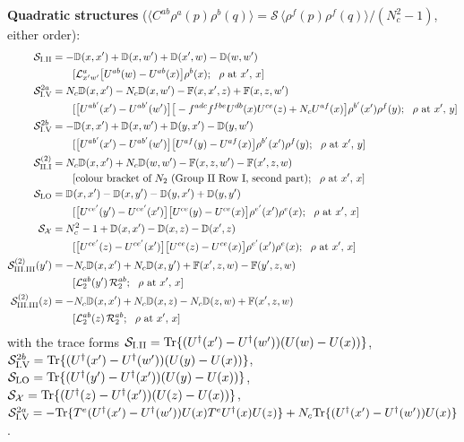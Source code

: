 \documentclass[9pt]{article}
\def\mf#1{\mathbb{#1}}
\numberwithin{equation}{section}
\begin{document}
{\noindent\textbf{Quadratic structures} ($\langle C^{ab}\rho^{a}(p)\rho^{b}(q)\rangle=\mathcal{S}\,\langle\rho^{f}(p)\rho^{f}(q)\rangle/(N_{c}^{2}-1)$, either order):
\begin{align}
\mathcal{S}_{\rm I.II}&=-\mf{D}(x,x')+\mf{D}(x,w')+\mf{D}(x',w)-\mf{D}(w,w')\notag\\&\qquad[\mathcal{L}^{a}_{x'w'}\big[U^{ab}(w)-U^{ab}(x)\big]\rho^{b}(x);\ \ \rho\text{ at }x',\,x]\notag\\
\mathcal{S}_{\rm I.V}^{2a}&=N_{c}\mf{D}(x,x')-N_{c}\mf{D}(x,w')-\mf{F}(x,x',z)+\mf{F}(x,z,w')\notag\\&\qquad[\big[U^{ab'}(x')-U^{ab'}(w')\big]\big[-f^{adc}f^{fbe}U^{db}(x)U^{ce}(z)+N_{c}U^{af}(x)\big]\rho^{b'}(x')\rho^{f}(y);\ \ \rho\text{ at }x',\,y]\notag\\
\mathcal{S}_{\rm I.V}^{2b}&=-\mf{D}(x,x')+\mf{D}(x,w')+\mf{D}(y,x')-\mf{D}(y,w')\notag\\&\qquad[\big[U^{ab'}(x')-U^{ab'}(w')\big]\big[U^{af}(y)-U^{af}(x)\big]\rho^{b'}(x')\rho^{f}(y);\ \ \rho\text{ at }x',\,y]\notag\\
\mathcal{S}_{\rm II.I}^{(2)}&=N_{c}\mf{D}(x,x')+N_{c}\mf{D}(w,w')-\mf{F}(x,z,w')-\mf{F}(x',z,w)\notag\\&\qquad[\text{colour bracket of } N_{2}\text{ (Group II Row I, second part)};\ \ \rho\text{ at }x',\,x]\notag\\
\mathcal{S}_{\rm LO}&=\mf{D}(x,x')-\mf{D}(x,y')-\mf{D}(y,x')+\mf{D}(y,y')\notag\\&\qquad[\big[U^{ce'}(y')-U^{ce'}(x')\big]\big[U^{ce}(y)-U^{ce}(x)\big]\rho^{e'}(x')\rho^{e}(x);\ \ \rho\text{ at }x',\,x]\notag\\
\mathcal{S}_{\mathcal{X}}&=N_{c}^{2}-1+\mf{D}(x,x')-\mf{D}(x,z)-\mf{D}(x',z)\notag\\&\qquad[\big[U^{ce'}(z)-U^{ce'}(x')\big]\big[U^{ce}(z)-U^{ce}(x)\big]\rho^{e'}(x')\rho^{e}(x);\ \ \rho\text{ at }x',\,x]\notag\\
\mathcal{S}_{\rm III.III}^{(2)}(y')&=-N_{c}\mf{D}(x,x')+N_{c}\mf{D}(x,y')+\mf{F}(x',z,w)-\mf{F}(y',z,w)\notag\\&\qquad[\mathcal{L}_{2}^{ab}(y')\,\mathcal{R}_{2}^{ab};\ \ \rho\text{ at }x',\,x]\notag\\
\mathcal{S}_{\rm III.III}^{(2)}(z)&=-N_{c}\mf{D}(x,x')+N_{c}\mf{D}(x,z)-N_{c}\mf{D}(z,w)+\mf{F}(x',z,w)\notag\\&\qquad[\mathcal{L}_{2}^{ab}(z)\,\mathcal{R}_{2}^{ab};\ \ \rho\text{ at }x',\,x]\notag
\end{align}
with the trace forms $\mathcal{S}_{\rm I.II}={\rm Tr}\{(U^{\dagger}(x')-U^{\dagger}(w'))(U(w)-U(x))\}$, $\mathcal{S}_{\rm I.V}^{2b}={\rm Tr}\{(U^{\dagger}(x')-U^{\dagger}(w'))(U(y)-U(x))\}$, $\mathcal{S}_{\rm LO}={\rm Tr}\{(U^{\dagger}(y')-U^{\dagger}(x'))(U(y)-U(x))\}$, $\mathcal{S}_{\mathcal{X}}={\rm Tr}\{(U^{\dagger}(z)-U^{\dagger}(x'))(U(z)-U(x))\}$, $\mathcal{S}^{2a}_{\rm I.V}=-{\rm Tr}\{T^{e}(U^{\dagger}(x')-U^{\dagger}(w'))U(x)T^{e}U^{\dagger}(x)U(z)\}+N_{c}{\rm Tr}\{(U^{\dagger}(x')-U^{\dagger}(w'))U(x)\}$.\par
}
\end{document}
